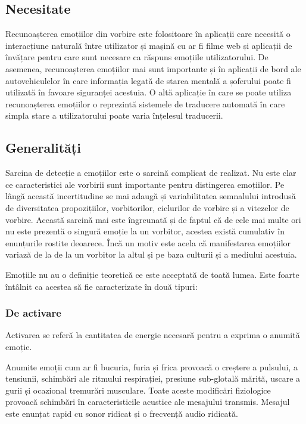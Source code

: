 \documentclass[9pt,shortpaper,twoside,web]{ieeecolor}
\begin{document}
\subsection{Necesitate}
Recunoașterea emoțiilor din vorbire este folositoare în aplicații care necesită o interacțiune naturală între utilizator și mașină cu ar fi filme web și aplicații de învățare pentru care sunt necesare ca răspuns emoțiile utilizatorului. De asemenea, recunoașterea emoțiilor mai sunt importante și în aplicații de bord ale autovehiculelor în care informația legată de starea mentală a șoferului poate fi utilizată în favoare siguranței acestuia. O altă aplicație în care se poate utiliza recunoașterea emoțiilor o reprezintă sistemele de traducere automată în care simpla stare a utilizatorului poate varia înțelesul traducerii.


\subsection{Generalități}
Sarcina de detecție a emoțiilor este o sarcină complicat de realizat. Nu este clar ce caracteristici ale vorbirii sunt importante pentru distingerea emoțiilor. Pe lângă această incertitudine se mai adaugă și variabilitatea semnalului introdusă de diversitatea propozițiilor, vorbitorilor, ciclurilor de vorbire și a vitezelor de vorbire. Această sarcină mai este îngreunată și de faptul că de cele mai multe ori nu este prezentă o singură emoție la un vorbitor, acestea există cumulativ în enunțurile rostite deoarece. Încă un motiv este acela că manifestarea emoțiilor variază de la de la un vorbitor la altul și pe baza culturii și a mediului acestuia. 

Emoțiile nu au o definiție teoretică ce este acceptată de toată lumea. Este foarte întâlnit ca acestea să fie caracterizate în două tipuri:


\subsubsection{De activare}
Activarea se referă la cantitatea de energie necesară pentru a exprima o anumită emoție.

Anumite emoții cum ar fi bucuria, furia și frica provoacă o creștere a pulsului, a tensiunii, schimbări ale ritmului respirației, presiune sub-glotală mărită, uscare a gurii și ocazional tremurări musculare. Toate aceste modificări fiziologice provoacă schimbări în caracteristicile acustice ale mesajului transmis. Mesajul este enunțat rapid cu sonor ridicat și o frecvență audio ridicată.
\end{document}
